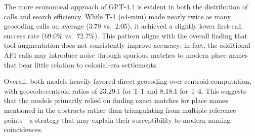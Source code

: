 The more economical approach of GPT-4.1 is evident in both the
distribution of calls and search efficiency. While T-1 (o4-mini) made
nearly twice as many geocoding calls on average (3.79 vs.~2.05), it
achieved a slightly lower first-call success rate (69.0\% vs.~72.7\%).
This pattern aligns with the overall finding that tool augmentation does
not consistently improve accuracy; in fact, the additional API calls may
introduce noise through spurious matches to modern place names that bear
little relation to colonial-era settlements.

Overall, both models heavily favored direct geocoding over centroid
computation, with geocode:centroid ratios of 23.29:1 for T-1 and 8.18:1
for T-4. This suggests that the models primarily relied on finding exact
matches for place names mentioned in the abstracts rather than
triangulating from multiple reference points---a strategy that may
explain their susceptibility to modern naming coincidences.
